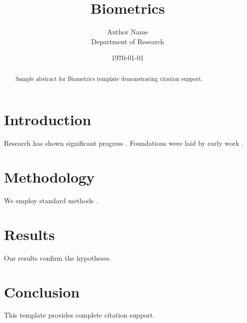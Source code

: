 \documentclass{wiley-nj}
\title{Biometrics}
\author{Author Name \\ \small Department of Research}
\date{\today}
\begin{document}
\maketitle

\begin{abstract}
Sample abstract for Biometrics template demonstrating citation support.
\end{abstract}

\section{Introduction}
Research has shown significant progress \citep{einstein1905}. Foundations were laid by early work \citep{turing1950}.

\section{Methodology}
We employ standard methods \citep{knuth1984}.

\section{Results}
Our results confirm the hypotheses.

\section{Conclusion}
This template provides complete citation support.



\end{document}
